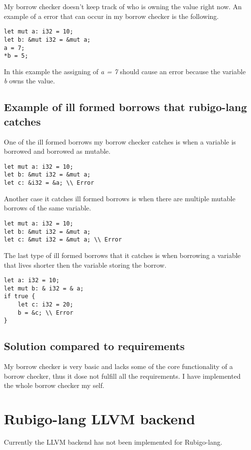 \documentclass[12pt]{article}
\begin{document}
		My borrow checker doesn't keep track of who is owning the value right now. An example of a error that can occur in my borrow checker is the following.

	\begin{verbatim}
let mut a: i32 = 10;
let b: &mut i32 = &mut a;
a = 7;
*b = 5;
    	\end{verbatim}

	In this example the assigning of \emph{a = 7} should cause an error because the variable \emph{b} owns the value.



	\subsection{Example of ill formed borrows that rubigo-lang catches}
		One of the ill formed borrows my borrow checker catches is when a variable is borrowed and borrowed as mutable.
	\begin{verbatim}
let mut a: i32 = 10;
let b: &mut i32 = &mut a;
let c: &i32 = &a; \\ Error
    	\end{verbatim}

	Another case it catches ill formed borrows is when there are multiple mutable borrows of the same variable.
	\begin{verbatim}
let mut a: i32 = 10;
let b: &mut i32 = &mut a;
let c: &mut i32 = &mut a; \\ Error
    	\end{verbatim}

	The last type of ill formed borrows that it catches is when borrowing a variable that lives shorter then the variable storing the borrow.
	\begin{verbatim}
let a: i32 = 10;
let mut b: & i32 = & a;
if true {
    let c: i32 = 20;
    b = &c; \\ Error
}
    	\end{verbatim}


	\subsection{Solution compared to requirements}
		My borrow checker is very basic and lacks some of the core functionality of a borrow checker, thus it dose not fulfill all the requirements. I have implemented the whole borrow checker my self.  


    \section{Rubigo-lang LLVM backend}	
    	Currently the LLVM backend has not been implemented for Rubigo-lang.
	
\end{document}
